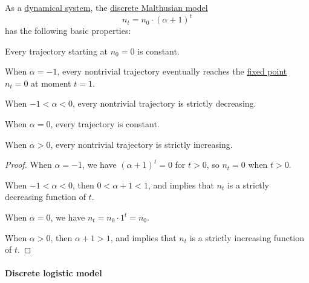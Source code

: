 \begin{proposition}\label{thm:discrete_malthusian_model_dynamics}
  As a \hyperref[def:dynamical_system]{dynamical system}, the \hyperref[def:discrete_malthusian_model]{discrete Malthusian model}
  \begin{equation*}
    n_t = n_0 \cdot (\alpha + 1)^t
  \end{equation*}
  has the following basic properties:
  \begin{thmenum}
     Every trajectory starting at \( n_0 = 0 \) is constant.

     When \( \alpha = -1 \), every nontrivial trajectory eventually reaches the \hyperref[def:dynamical_system_fixed_point]{fixed point} \( n_t = 0 \) at moment \( t = 1 \).

     When \( -1 < \alpha < 0 \), every nontrivial trajectory is strictly decreasing.

     When \( \alpha = 0 \), every trajectory is constant.

     When \( \alpha > 0 \), every nontrivial trajectory is strictly increasing.
  \end{thmenum}
\end{proposition}
\begin{proof}
   When \( \alpha = -1 \), we have \( (\alpha + 1)^t = 0 \) for \( t > 0 \), so \( n_t = 0 \) when \( t > 0 \).

   When \( -1 < \alpha < 0 \), then \( 0 < \alpha + 1 < 1 \), and  implies that \( n_t \) is a strictly decreasing function of \( t \).

   When \( \alpha = 0 \), we have \( n_t = n_0 \cdot 1^t = n_0 \).

   When \( \alpha > 0 \), then \( \alpha + 1 > 1 \), and  implies that \( n_t \) is a strictly increasing function of \( t \).
\end{proof}

\paragraph{Discrete logistic model}

